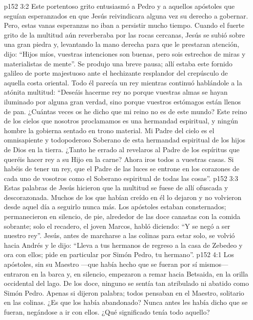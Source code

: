 \vs p152 3:2 Este portentoso grito entusiasmó a Pedro y a aquellos apóstoles que seguían esperanzados en que Jesús reivindicara alguna vez su derecho a gobernar. Pero, estas vanas esperanzas no iban a persistir mucho tiempo. Cuando el fuerte grito de la multitud aún reverberaba por las rocas cercanas, Jesús se subió sobre una gran piedra y, levantando la mano derecha para que le prestaran atención, dijo: “Hijos míos, vuestras intenciones son buenas, pero sois estrechos de miras y materialistas de mente”. Se produjo una breve pausa; allí estaba este fornido galileo de porte majestuoso ante el hechizante resplandor del crepúsculo de aquella costa oriental. Todo él parecía un rey mientras continuó hablándole a la atónita multitud: “Deseáis hacerme rey no porque vuestras almas se hayan iluminado por alguna gran verdad, sino porque vuestros estómagos están llenos de pan. ¿Cuántas veces os he dicho que mi reino no es de este mundo? Este reino de los cielos que nosotros proclamamos es una hermandad espiritual, y ningún hombre la gobierna sentado en trono material. Mi Padre del cielo es el omnisapiente y todopoderoso Soberano de esta hermandad espiritual de los hijos de Dios en la tierra. ¿Tanto he errado al revelaros al Padre de los espíritus que queréis hacer rey a su Hijo en la carne? Ahora iros todos a vuestras casas. Si habéis de tener un rey, que el Padre de las luces se entrone en los corazones de cada uno de vosotros como el Soberano espiritual de todas las cosas”.
\vs p152 3:3 \pc Estas palabras de Jesús hicieron que la multitud se fuese de allí ofuscada y descorazonada. Muchos de los que habían creído en él lo dejaron y no volvieron desde aquel día a seguirlo nunca más. Los apóstoles estaban consternados; permanecieron en silencio, de pie, alrededor de las doce canastas con la comida sobrante; solo el recadero, el joven Marcos, habló diciendo: “Y se negó a ser nuestro rey”. Jesús, antes de marcharse a las colinas para estar solo, se volvió hacia Andrés y le dijo: “Lleva a tus hermanos de regreso a la casa de Zebedeo y ora con ellos; pide en particular por Simón Pedro, tu hermano”.
\vs p152 4:1 Los apóstoles, sin su Maestro ---que había hecho que se fueran por sí mismos--- entraron en la barca y, en silencio, empezaron a remar hacia Betsaida, en la orilla occidental del lago. De los doce, ninguno se sentía tan atribulado ni abatido como Simón Pedro. Apenas si dijeron palabra; todos pensaban en el Maestro, solitario en las colinas. ¿Es que los había abandonado? Nunca antes les había dicho que se fueran, negándose a ir con ellos. ¿Qué significado tenía todo aquello?
